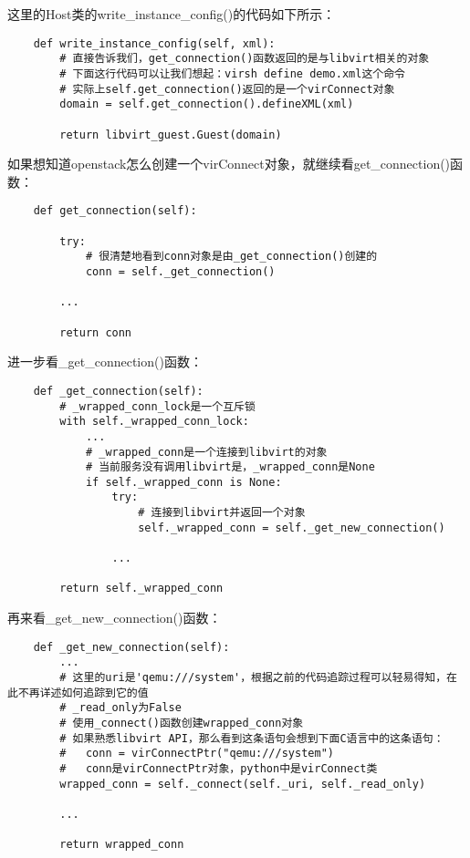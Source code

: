 \documentclass[a4paper,left=1.5cm,right=1.5cm,11pt]{article}
\begin{document}
	这里的Host类的write\_instance\_config()的代码如下所示：
	\begin{lstlisting}
	def write_instance_config(self, xml):
		# 直接告诉我们，get_connection()函数返回的是与libvirt相关的对象
		# 下面这行代码可以让我们想起：virsh define demo.xml这个命令
		# 实际上self.get_connection()返回的是一个virConnect对象
        domain = self.get_connection().defineXML(xml)

        return libvirt_guest.Guest(domain)
	\end{lstlisting}

	如果想知道openstack怎么创建一个virConnect对象，就继续看get\_connection()函数：
	\begin{lstlisting}
	def get_connection(self):
        
        try:
			# 很清楚地看到conn对象是由_get_connection()创建的
            conn = self._get_connection()
        
		...

        return conn
	\end{lstlisting}

	进一步看\_get\_connection()函数：
	\begin{lstlisting}
	def _get_connection(self):
		# _wrapped_conn_lock是一个互斥锁
        with self._wrapped_conn_lock:
			...
			# _wrapped_conn是一个连接到libvirt的对象
            # 当前服务没有调用libvirt是，_wrapped_conn是None
            if self._wrapped_conn is None:
                try:
                    # 连接到libvirt并返回一个对象
                    self._wrapped_conn = self._get_new_connection()
                
				...

        return self._wrapped_conn
	\end{lstlisting}

	再来看\_get\_new\_connection()函数：
	\begin{lstlisting}
	def _get_new_connection(self):
        ...
		# 这里的uri是'qemu:///system'，根据之前的代码追踪过程可以轻易得知，在此不再详述如何追踪到它的值
		# _read_only为False
		# 使用_connect()函数创建wrapped_conn对象
		# 如果熟悉libvirt API，那么看到这条语句会想到下面C语言中的这条语句：
		#	conn = virConnectPtr("qemu:///system")
		#	conn是virConnectPtr对象，python中是virConnect类
        wrapped_conn = self._connect(self._uri, self._read_only)

        ...

        return wrapped_conn
	\end{lstlisting}
\end{document}
